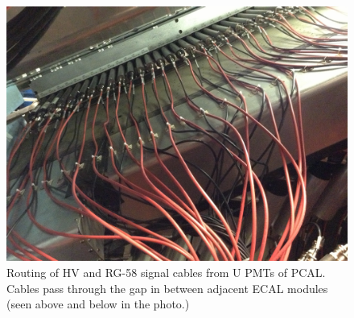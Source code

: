 \documentclass[letterpaper,10pt]{article}
\begin{document}
\begin{figure}[htbp]
  \centering
  \includegraphics[width= 5in, keepaspectratio = true]{pcal-installation-3.jpg}
  \vspace{2mm}
  \caption{Routing of HV and RG-58 signal cables from U PMTs of PCAL.  Cables pass through the
  gap in between adjacent ECAL modules (seen above and below in the photo.)}
\label{pcal-pmts-3}
\end{figure}
\end{document}
